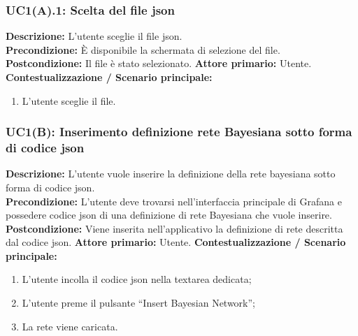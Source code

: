                     \clearpage    
                    
                \subsubsection{UC1(A).1: Scelta del file json }
                     \textbf{Descrizione:} L’utente sceglie il file json.\\
                    \textbf{Precondizione:} È disponibile la schermata di selezione del file.   
                    \newline
                    \textbf{Postcondizione:} Il file è stato selezionato. 
                    \newline
                    \textbf{Attore primario:} Utente.
                    \newline
                    \textbf{Contestualizzazione / Scenario principale:} \begin{enumerate}
                        \item L’utente sceglie il file.
                    \end{enumerate}
                    
                        
                \subsubsection{UC1(B): Inserimento definizione rete Bayesiana sotto forma di codice json}
                    \textbf{Descrizione:} L’utente vuole inserire la definizione della rete bayesiana sotto forma di codice json.\\
                    \textbf{Precondizione:}  L’utente deve trovarsi nell'interfaccia principale di Grafana e possedere codice json di una definizione di rete Bayesiana che vuole inserire.
                    \newline
                    \textbf{Postcondizione:} Viene inserita nell'applicativo la definizione di rete descritta dal codice json.
                    \newline
                    \textbf{Attore primario:} Utente.
                    \newline
                    \textbf{Contestualizzazione / Scenario principale:} \begin{enumerate}
                        \item L’utente incolla il codice json nella textarea dedicata;
                        \item L’utente preme il pulsante “Insert Bayesian Network”;
                        \item La rete viene caricata.
                    \end{enumerate}
                    
